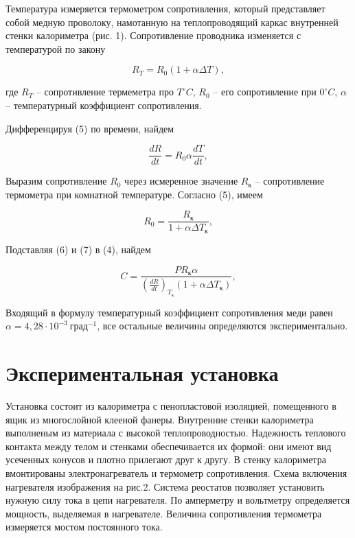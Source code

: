 \documentclass[a4paper, 12pt]{article}
\begin{document}
Температура измеряется термометром сопротивления, который представляет собой медную проволоку, намотанную на теплопроводящий каркас внутренней стенки калориметра (рис. 1). Сопротивление проводника изменяется с температурой по закону

\begin{equation}
	R_{T} = R_{0}(1 + \alpha \Delta T),
	\label{RT}
\end{equation}

где $R_{T}$ -- сопротивление термеметра про $T  ^{\circ}C$, $R_{0}$ -- его сопротивление при $0  ^{\circ}C$, $\alpha$ -- температурный коэффициент сопротивления. 

Дифференцируя (5) по времени, найдем

\begin{equation}
	\frac{dR}{dt} = R_{0}\alpha \frac{dT}{dt},
	\label{dRT}
\end{equation}

Выразим сопротивление $R_{0}$ через исмеренное значение $R_{\text{к}}$ -- сопротивление термометра при комнатной температуре. Согласно (5), имеем

\begin{equation}
	R_{0} = \frac{R_{\text{к}}}{1 + \alpha \Delta T_{\text{к}}},
	\label{R0}
\end{equation}

Подставляя (6) и (7) в (4), найдем

\begin{equation}
	C = \frac{PR_{\text{к}} \alpha}{(\frac{dR}{dt})_{T_{\text{к}}}(1 + \alpha \Delta T_{\text{к}})},
	\label{capacity}
\end{equation}

Входящий в формулу температурный коэффициент сопротивления меди равен $\alpha = 4,28 \cdot 10^{-3}~\text{град}^{-1}$, все остальные величины определяются экспериментально. 
	
	\section{Экспериментальная установка}
	Установка состоит из калориметра с пенопластовой изоляцией, помещенного в ящик из многослойной клееной фанеры. Внутренние стенки калориметра выполненым из материала с высокой теплопроводностью. Надежность теплового контакта между телом и стенками обеспечивается их формой: они имеют вид усеченных конусов и плотно прилегают друг к другу. В стенку калориметра вмонтированы электронагреватель и термометр сопротивления. Схема включения нагревателя изображения на рис.2. Система реостатов позволяет установить нужную силу тока в цепи нагревателя. По амперметру и вольтметру определяется мощность, выделяемая в нагревателе. Величина сопротивления термометра измеряется мостом постоянного тока.
	
\end{document}
